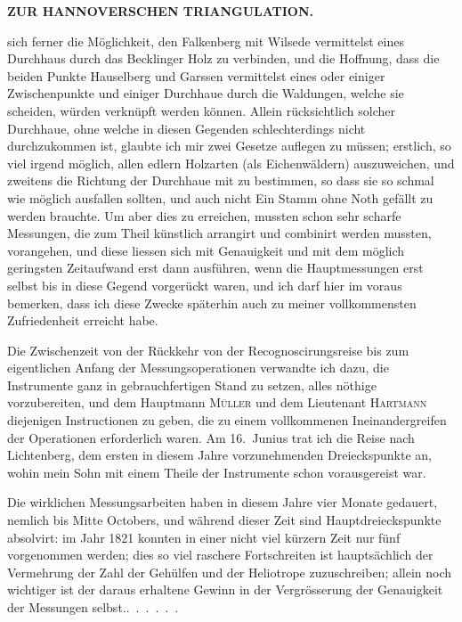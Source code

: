 \par\clearpage
\noindent\null\hfill{\small\textbf{ZUR HANNOVERSCHEN TRIANGULATION.}}\hfill{}\par\medskip
\noindent sich ferner die Möglichkeit, den Falkenberg mit Wilsede vermittelst eines
Durchhaus durch das Becklinger Holz zu verbinden, und die Hoffnung, dass
die beiden Punkte Hauselberg und Garssen vermittelst eines oder einiger
Zwischenpunkte und einiger Durchhaue durch die Waldungen, welche sie
scheiden, würden verknüpft werden können. Allein rücksichtlich solcher
Durchhaue, ohne welche in diesen Gegenden schlechterdings nicht durchzukommen
ist, glaubte ich mir zwei Gesetze auflegen zu müssen; erstlich, so
viel irgend möglich, allen edlern Holzarten (als Eichenwäldern) auszuweichen,
und zweitens die Richtung der Durchhaue  mit 
zu bestimmen, so dass sie so schmal wie möglich ausfallen sollten, und
auch nicht Ein Stamm ohne Noth gefällt zu werden brauchte. Um aber
dies zu erreichen, mussten schon sehr scharfe Messungen, die zum Theil
künstlich arrangirt und combinirt werden mussten, vorangehen, und diese
liessen sich mit Genauigkeit und mit dem möglich geringsten Zeitaufwand erst
dann ausführen, wenn die Hauptmessungen erst selbst bis in diese Gegend
vorgerückt waren, und ich darf hier im voraus bemerken, dass ich diese
Zwecke späterhin auch zu meiner vollkommensten Zufriedenheit erreicht habe.

Die Zwischenzeit von der Rückkehr von der Recognoscirungsreise bis
zum eigentlichen Anfang der Messungsoperationen verwandte ich dazu, die
Instrumente ganz in gebrauchfertigen Stand zu setzen, alles nöthige vorzubereiten,
und dem Hauptmann \textsc{Müller} und dem Lieutenant \textsc{Hartmann} diejenigen
Instructionen zu geben, die zu einem vollkommenen Ineinandergreifen
der Operationen erforderlich waren. Am 16.~Junius trat ich die Reise nach
Lichtenberg, dem ersten in diesem Jahre vorzunehmenden Dreieckspunkte an,
wohin mein Sohn mit einem Theile der Instrumente schon vorausgereist war.

Die wirklichen Messungsarbeiten haben in diesem Jahre vier Monate gedauert,
nemlich bis Mitte Octobers, und während dieser Zeit sind 
Hauptdreieckspunkte absolvirt: im Jahr 1821 konnten in einer nicht viel
kürzern Zeit nur fünf vorgenommen werden; dies so viel raschere Fortschreiten
ist hauptsächlich der Vermehrung der Zahl der Gehülfen und der
Heliotrope zuzuschreiben; allein noch wichtiger ist der daraus erhaltene Gewinn
in der Vergrösserung der Genauigkeit der Messungen selbst.\quad\mbox{.\ .\ .\ .\ .\ .}

